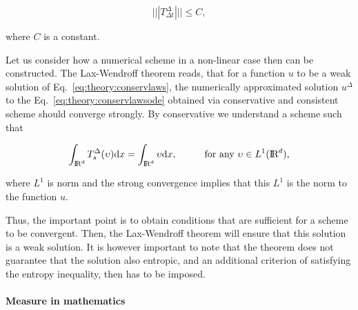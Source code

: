 \begin{equation}
|||T^{\Delta}_{\Delta t}||| \leq C,
\end{equation}

where $C$ is a constant. 

Let us consider how a numerical scheme in a non-linear case then can be constructed. The Lax-Wendroff theorem \citep{Lax:1960} reads, that for a function $u$ to be a weak solution of Eq.~\eqref{eq:theory:conservlaws}, the numerically approximated solution $u^{\Delta}$ to the Eq.~\eqref{eq:theory:conservlawsode} obtained via conservative and consistent scheme should converge strongly. 
By conservative we understand a scheme such that 

\begin{equation}
\int_{\text{I\!R}^d} T^{\Delta}_s(\upsilon)\text{d}x = \int_{\text{I\!R}^d}\upsilon\text{d}x, \hspace{10mm} \text{for any } \upsilon\in L^1(\text{I\!R}^d),
\end{equation}

where $L^1$ is norm and the strong convergence implies that this $L^1$ is the norm to the function $u$. 

Thus, the important point is to obtain conditions that are sufficient for a scheme to be convergent. Then, the Lax-Wendroff theorem will ensure that this solution is a weak solution. 
%
It is however important to note that the theorem does not guarantee that the solution also entropic, and an additional criterion of satisfying the entropy inequality, then has to be imposed. 


\paragraph{Measure in mathematics} 


